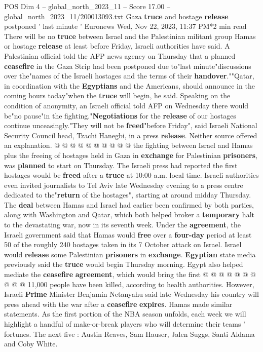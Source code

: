 \begin{textsample}{POS Dim 4 – global\_north\_2023\_11 – Score 17.00 – global\_north\_2023\_11/200013093.txt}  \label{ex:f4_pos_208}
Gaza \textbf{truce} and hostage \textbf{release} postponed ' last minute ' Euronews Wed, Nov 22, 2023, 11:37 PM*2 min read There will be no \textbf{truce} between Israel and the Palestinian militant group Hamas or hostage \textbf{release} at least before Friday, Israeli authorities have said.
A Palestinian official told the AFP news agency on Thursday that a planned \textbf{ceasefire} in the Gaza Strip had been postponed due to"last minute"discussions over the"names of the Israeli hostages and the terms of their \textbf{handover}.""Qatar, in coordination with the \textbf{Egyptians} and the Americans, should announce in the coming hours today"when the \textbf{truce} will begin, he said.
Speaking on the condition of anonymity, an Israeli official told AFP on Wednesday there would be"no pause"in the fighting."\textbf{Negotiations} for the \textbf{release} of our hostages continue unceasingly."They will not be \textbf{freed}"before Friday", said Israeli National Security Council head, Tzachi Hanegbi, in a press \textbf{release}.
Neither source offered an explanation. @ @ @ @ @ @ @ @ @ @ the fighting between Israel and Hamas plus the freeing of hostages held in Gaza in \textbf{exchange} for Palestinian \textbf{prisoners}, was \textbf{planned} to start on Thursday.
The Israeli press had reported the first hostages would be \textbf{freed} after a \textbf{truce} at 10:00 a.m. local time.
Israeli authorities even invited journalists to Tel Aviv late Wednesday evening to a press centre dedicated to the"\textbf{return} of the hostages", starting at around midday Thursday.
The \textbf{deal} between Hamas and Israel had earlier been confirmed by both parties, along with Washington and Qatar, which both helped broker a \textbf{temporary} halt to the devastating war, now in its seventh week.
Under the \textbf{agreement}, the Israeli government said that Hamas would \textbf{free} over a \textbf{four-day} period at least 50 of the roughly 240 hostages taken in its 7 October attack on Israel.
Israel would \textbf{release} some Palestinian \textbf{prisoners} in \textbf{exchange}. \textbf{Egyptian} state media previously said the \textbf{truce} would begin Thursday morning.
Egypt also helped mediate the \textbf{ceasefire} \textbf{agreement}, which would bring the first @ @ @ @ @ @ @ @ @ @ 11,000 people have been killed, according to health authorities.
However, Israeli \textbf{Prime} Minister Benjamin Netanyahu said late Wednesday his country will press ahead with the war after a \textbf{ceasefire} \textbf{expires}.
Hamas made similar statements.
As the first portion of the NBA season unfolds, each week we will highlight a handful of make-or-break players who will determine their teams ' fortunes.
The next five : Austin Reaves, Sam Hauser, Jalen Suggs, Santi Aldama and Coby White.

\end{textsample}
